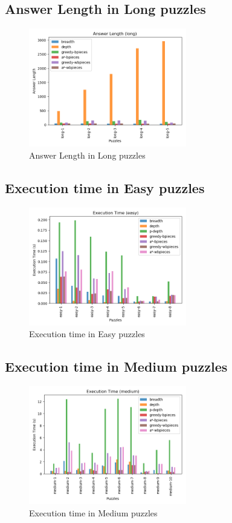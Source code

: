 \documentclass[conference]{IEEEtran}
\begin{document}
\subsection{Answer Length in Long puzzles}
\begin{figure}[H]
    \centerline{\includegraphics[width=260px]{../../graphics/answerLength-long.png}}
    \caption{Answer Length in Long puzzles}
\end{figure}

\subsection{Execution time in Easy puzzles}
\begin{figure}[H]
    \centerline{\includegraphics[width=260px]{../../graphics/executionTime-easy.png}}
    \caption{Execution time in Easy puzzles}
\end{figure}

\subsection{Execution time in Medium puzzles}
\begin{figure}[H]
    \centerline{\includegraphics[width=260px]{../../graphics/executionTime-medium.png}}
    \caption{Execution time in Medium puzzles}
\end{figure}
\end{document}
